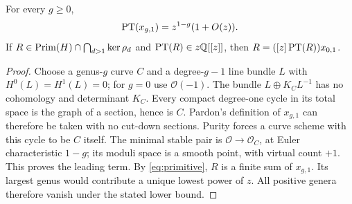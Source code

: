 \begin{lemma}\label{lem:pt}
For every $g\ge0$,
\[
 \operatorname{PT}(x_{g,1})=z^{1-g}(1+O(z)).
\]
If $R\in\operatorname{Prim}(H)\cap\bigcap_{d>1}\ker\rho_d$ and
$\operatorname{PT}(R)\in z\mathbb Q[[z]]$, then $R=([z]\operatorname{PT}(R))x_{0,1}$.
\end{lemma}
\begin{proof}
Choose a genus-$g$ curve $C$ and a degree-$g-1$ line bundle $L$ with
$H^0(L)=H^1(L)=0$; for $g=0$ use $\mathcal O(-1)$.
The bundle $L\oplus K_C L^{-1}$ has no cohomology and determinant
$K_C$. Every compact degree-one cycle in its total space is the graph
of a section, hence is $C$. Pardon's definition of $x_{g,1}$ can
therefore be taken with no cut-down sections. Purity forces a curve
scheme with this cycle to be $C$ itself. The minimal stable pair is
$\mathcal O\to\mathcal O_C$, at Euler characteristic $1-g$; its
moduli space is a smooth point, with virtual count $+1$.
This proves the leading term. By \eqref{eq:primitive}, $R$ is a finite
sum of $x_{g,1}$. Its largest genus would contribute a unique lowest
power of $z$. All positive genera therefore vanish under the stated
lower bound.
\end{proof}
